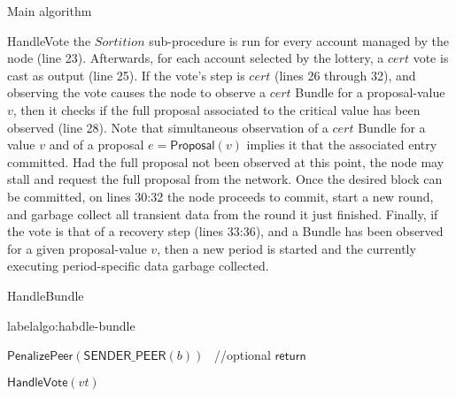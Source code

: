 \documentclass[10pt,a4paper]{article}
\begin{document}
\begin{section}{Main algorithm}
\begin{subsection}{HandleVote}
the $Sortition$ sub-procedure is run for every account managed by the node (line 23). Afterwards, for each account selected by
the lottery, a $cert$ vote is cast as output (line 25).
If the vote's step is $cert$ (lines 26 through 32), and observing the vote causes the node to observe a $cert$ Bundle for a proposal-value $v$,
then it checks if the full proposal associated to the critical value has been observed (line 28). Note that simultaneous observation of a $cert$ Bundle 
for a value $v$ and of a proposal $e = \mathsf{Proposal}(v)$ implies it that the associated entry committed.
Had the full proposal not been observed at this point, the node may stall and request the full proposal from the network.
Once the desired block can be committed, on lines 30:32 the node proceeds to commit, start a new round, and garbage collect all
transient data from the round it just finished.
Finally, if the vote is that of a recovery step (lines 33:36), and a Bundle has been observed for a given proposal-value $v$,
then a new period is started and the currently executing period-specific data garbage collected.



\end{subsection}


\begin{subsection}{HandleBundle}\label{ssect:HandleBundle}

    \begin{algorithm}[H]
        \caption{\underline{HandleBundle}}
        label{algo:habdle-bundle}
        \begin{algorithmic}[1]



                \State $\mathsf{PenalizePeer}(\mathsf{SENDER\_PEER}(b))$ \ //optional
                \State $\mathsf{return}$
            \EndIf

                    \State $\mathsf{HandleVote}(vt)$
                \EndFor
            \EndIf


\end{algorithmic}
\end{algorithm}
\end{subsection}
\end{section}
\end{document}
